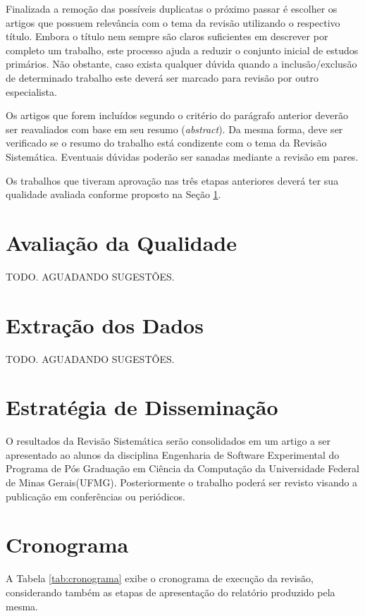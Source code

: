 \documentclass{article}
\begin{document}
Finalizada a remoção das possíveis duplicatas o próximo passar é escolher os
artigos que possuem relevância com o tema da revisão utilizando o respectivo
título. Embora o título nem sempre são claros suficientes em descrever por
completo um trabalho, este processo ajuda a reduzir o conjunto inicial de
estudos primários. Não obstante, caso exista qualquer dúvida quando a
inclusão/exclusão de determinado trabalho este deverá ser marcado para revisão
por outro especialista.

Os artigos que forem incluídos segundo o critério do parágrafo anterior deverão
ser reavaliados com base em seu resumo (\textit{abstract}). Da mesma forma,
deve ser verificado se o resumo do trabalho está condizente com o tema da
Revisão Sistemática. Eventuais dúvidas poderão ser sanadas mediante a revisão
em pares.

Os trabalhos que tiveram aprovação nas três etapas anteriores deverá ter sua
qualidade avaliada conforme proposto na Seção \ref{sec:qualidade}.

\section{Avaliação da Qualidade}
\label{sec:qualidade}

TODO. AGUADANDO SUGESTÕES.

\section{Extração dos Dados}
\label{sec:extracao_dados}


TODO. AGUADANDO SUGESTÕES.


\section{Estratégia de Disseminação}
\label{sec:dissiminacao}
O resultados da Revisão Sistemática serão consolidados em um artigo a ser
apresentado ao alunos da disciplina Engenharia de Software Experimental do
Programa de Pós Graduação em Ciência da Computação da Universidade Federal de
Minas Gerais(UFMG). Posteriormente o trabalho poderá ser revisto visando a
publicação em conferências ou periódicos.
\section{Cronograma}
\label{sec:cronograma}


A Tabela \ref{tab:cronograma} exibe o cronograma de execução da revisão, considerando
também as etapas de apresentação do relatório produzido pela mesma.
\end{document}

